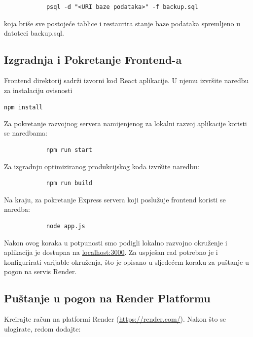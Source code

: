 			\begin{verbatim}
			psql -d "<URI baze podataka>" -f backup.sql
			\end{verbatim}
			
			koja briše sve postojeće tablice i restaurira stanje baze podataka spremljeno u datoteci backup.sql.
			
			\subsection{Izgradnja i Pokretanje Frontend-a}
			
			Frontend direktorij sadrži izvorni kod React aplikacije. U njemu izvršite naredbu za instalaciju ovisnosti 

			\texttt{npm install}

			Za pokretanje razvojnog servera namijenjenog za lokalni razvoj aplikacije koristi se naredbama:
			
			\begin{verbatim}
			npm run start
			\end{verbatim}
			
			Za izgradnju optimiziranog produkcijskog koda izvršite naredbu:
			
			\begin{verbatim}
			npm run build
			\end{verbatim}
			
			Na kraju, za pokretanje Express servera koji poslužuje frontend koristi se naredba:
			
			\begin{verbatim}
			node app.js
			\end{verbatim}
			
			Nakon ovog koraka u potpunosti smo podigli lokalno razvojno okruženje i aplikacija je dostupna na \url{localhost:3000}. Za uspješan rad potrebno je i konfigurirati varijable okruženja, što je opisano u sljedećem koraku za puštanje u pogon na servis Render.
			
			\subsection{Puštanje u pogon na Render Platformu}
			
			Kreirajte račun na platformi Render (\url{https://render.com/}). Nakon što se ulogirate, redom dodajte:
			
